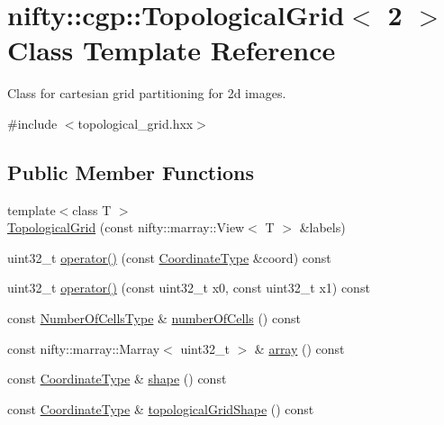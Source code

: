 \hypertarget{classnifty_1_1cgp_1_1TopologicalGrid_3_012_01_4}{}\section{nifty\+:\+:cgp\+:\+:Topological\+Grid$<$ 2 $>$ Class Template Reference}
\label{classnifty_1_1cgp_1_1TopologicalGrid_3_012_01_4}


Class for cartesian grid partitioning for 2d images.  




{\ttfamily \#include $<$topological\+\_\+grid.\+hxx$>$}

\subsection*{Public Member Functions}
\begin{DoxyCompactItemize}
\item 
{\footnotesize template$<$class T $>$ }\\\hyperlink{classnifty_1_1cgp_1_1TopologicalGrid_3_012_01_4_a7f422c1535a4d760394676b59a1999fd}{Topological\+Grid} (const nifty\+::marray\+::\+View$<$ T $>$ \&labels)
\item 
uint32\+\_\+t \hyperlink{classnifty_1_1cgp_1_1TopologicalGrid_3_012_01_4_a905b1a26a828342bddbaa0d0a77c0d34}{operator()} (const \hyperlink{classnifty_1_1array_1_1ArrayExtender}{Coordinate\+Type} \&coord) const 
\item 
uint32\+\_\+t \hyperlink{classnifty_1_1cgp_1_1TopologicalGrid_3_012_01_4_a4d4dbb40b2ae833b665ecd75fa35a48c}{operator()} (const uint32\+\_\+t x0, const uint32\+\_\+t x1) const 
\item 
const \hyperlink{classnifty_1_1array_1_1ArrayExtender}{Number\+Of\+Cells\+Type} \& \hyperlink{classnifty_1_1cgp_1_1TopologicalGrid_3_012_01_4_a648f9643f45483ad552c47fc4e6f2474}{number\+Of\+Cells} () const 
\item 
const nifty\+::marray\+::\+Marray$<$ uint32\+\_\+t $>$ \& \hyperlink{classnifty_1_1cgp_1_1TopologicalGrid_3_012_01_4_ac373f5fc62653d42ec7528ab68c70617}{array} () const 
\item 
const \hyperlink{classnifty_1_1array_1_1ArrayExtender}{Coordinate\+Type} \& \hyperlink{classnifty_1_1cgp_1_1TopologicalGrid_3_012_01_4_a78ec31f8506769cfe025bfe75f4a15bb}{shape} () const 
\item 
const \hyperlink{classnifty_1_1array_1_1ArrayExtender}{Coordinate\+Type} \& \hyperlink{classnifty_1_1cgp_1_1TopologicalGrid_3_012_01_4_a865eb87e808b65cc9aed40730b87f0f9}{topological\+Grid\+Shape} () const 
\end{DoxyCompactItemize}


